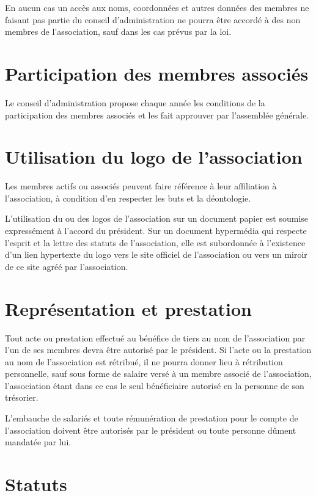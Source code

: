 \documentclass[a4wide,12pt]{scrartcl}
\begin{document}
En aucun cas un accès aux noms, coordonnées et autres données des
membres ne faisant pas partie du conseil d'administration ne pourra
être accordé à des non membres de l'association, sauf dans les cas
prévus par la loi.

\section{Participation des membres associés}

Le conseil d'administration propose chaque année les conditions de la
participation des membres associés et les fait approuver par
l'assemblée générale.

\section{Utilisation du logo de l'association}

Les membres actifs ou associés peuvent faire référence à leur
affiliation à l'association, à condition d'en respecter les buts et la
déontologie.

L'utilisation du ou des logos de l'association sur un document papier
est soumise expressément à l'accord du président. Sur un document
hypermédia qui respecte l'esprit et la lettre des statuts de
l'association, elle est subordonnée à l'existence d'un lien hypertexte
du logo vers le site officiel de l'association ou vers un miroir de ce
site agréé par l'association.

\section{Représentation et prestation}

Tout acte ou prestation effectué au bénéfice de tiers au nom de
l'association par l'un de ses membres devra être autorisé par le
président. Si l'acte ou la prestation au nom de l'association est
rétribué, il ne pourra donner lieu à rétribution personnelle, sauf
sous forme de salaire versé à un membre associé de l'association,
l'association étant dans ce cas le seul bénéficiaire autorisé en la
personne de son trésorier.

L'embauche de salariés et toute rémunération de prestation pour le
compte de l'association doivent être autorisés par le président ou
toute personne dûment mandatée par lui.

\section{Statuts}
\end{document}
